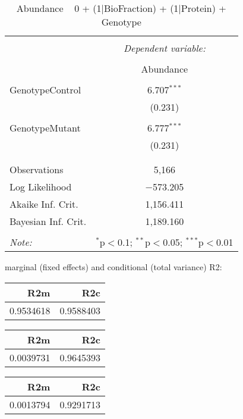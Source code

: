 \documentclass[11pt]{report}
\begin{document}
\begin{table}[!htbp] \centering 
  \caption{Abundance ~ 0 + (1|BioFraction) + (1|Protein) + Genotype} 
  \label{} 
\begin{tabular}{@{\extracolsep{5pt}}lc} 
\\[-1.8ex]\hline 
\hline \\[-1.8ex] 
 & \multicolumn{1}{c}{\textit{Dependent variable:}} \\ 
\cline{2-2} 
\\[-1.8ex] & Abundance \\ 
\hline \\[-1.8ex] 
 GenotypeControl & 6.707$^{***}$ \\ 
  & (0.231) \\ 
  & \\ 
 GenotypeMutant & 6.777$^{***}$ \\ 
  & (0.231) \\ 
  & \\ 
\hline \\[-1.8ex] 
Observations & 5,166 \\ 
Log Likelihood & $-$573.205 \\ 
Akaike Inf. Crit. & 1,156.411 \\ 
Bayesian Inf. Crit. & 1,189.160 \\ 
\hline 
\hline \\[-1.8ex] 
\textit{Note:}  & \multicolumn{1}{r}{$^{*}$p$<$0.1; $^{**}$p$<$0.05; $^{***}$p$<$0.01} \\ 
\end{tabular} 
\end{table} 
marginal (fixed effects) and conditional (total variance) R2:

\begin{tabular}{r|r}
\hline
R2m & R2c\\
\hline
0.9534618 & 0.9588403\\
\hline
\end{tabular}

\begin{tabular}{r|r}
\hline
R2m & R2c\\
\hline
0.0039731 & 0.9645393\\
\hline
\end{tabular}

\begin{tabular}{r|r}
\hline
R2m & R2c\\
\hline
0.0013794 & 0.9291713\\
\hline
\end{tabular}
\end{document}
